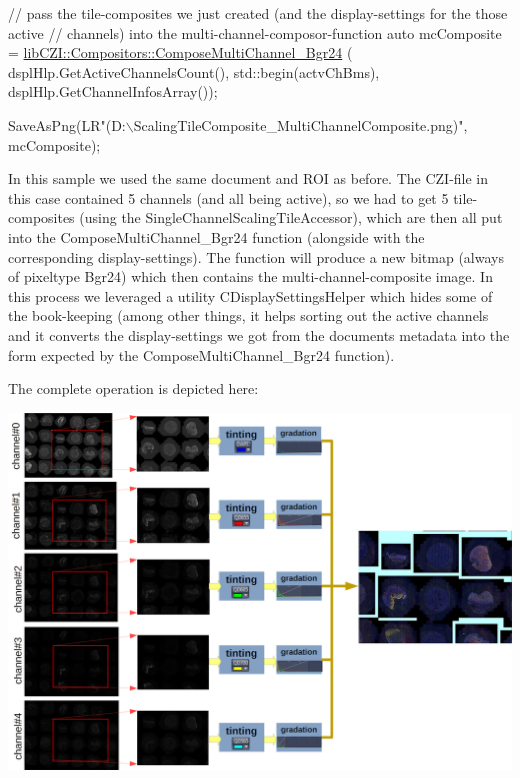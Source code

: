 \begin{DoxyCode}
\textcolor{comment}{// pass the tile-composites we just created (and the display-settings for the those active }
\textcolor{comment}{//  channels) into the multi-channel-composor-function}
\textcolor{keyword}{auto} mcComposite = \hyperlink{classlib_c_z_i_1_1_compositors_ab9be96d1b2b2e48c60c4dbf967e593c1}{libCZI::Compositors::ComposeMultiChannel\_Bgr24}
      (
    dsplHlp.GetActiveChannelsCount(),
    std::begin(actvChBms),
    dsplHlp.GetChannelInfosArray());

SaveAsPng(LR\textcolor{stringliteral}{"(D:\(\backslash\)ScalingTileComposite\_MultiChannelComposite.png)", mcComposite);}
\end{DoxyCode}


In this sample we used the same document and R\+OI as before. The C\+Z\+I-\/file in this case contained 5 channels (and all being \textquotesingle{}active\textquotesingle{}), so we had to get 5 tile-\/composites (using the Single\+Channel\+Scaling\+Tile\+Accessor), which are then all put into the {\ttfamily Compose\+Multi\+Channel\+\_\+\+Bgr24} function (alongside with the corresponding display-\/settings). The function will produce a new bitmap (always of pixeltype Bgr24) which then contains the multi-\/channel-\/composite image. In this process we leveraged a utility {\ttfamily C\+Display\+Settings\+Helper} which hides some of the book-\/keeping (among other things, it helps sorting out the \textquotesingle{}active\textquotesingle{} channels and it converts the display-\/settings we got from the document\textquotesingle{}s metadata into the form expected by the {\ttfamily Compose\+Multi\+Channel\+\_\+\+Bgr24} function).

The complete operation is depicted here\+:


\begin{DoxyImage}
\includegraphics[width=\textwidth,height=\textheight/2,keepaspectratio=true]{ScalingSingleChannelTileAccessor1.png}
\end{DoxyImage}
 